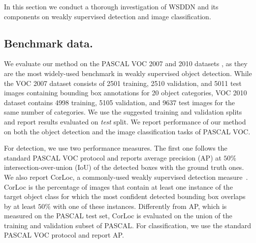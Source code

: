 In this section we conduct a thorough investigation of WSDDN and its components on weakly supervised detection and image classification.

\subsection{Benchmark data.}
We evaluate our method on the PASCAL VOC 2007 and 2010 datasets \cite{Everingham10}, as they are the most widely-used benchmark in weakly supervised object detection. While the VOC 2007 dataset consists of 2501 training, 2510 validation, and 5011 test images containing bounding box annotations for 20 object categories, VOC 2010 dataset contains 4998 training, 5105 validation, and 9637 test images for the same number of categories. We use the suggested training and validation splits and report results evaluated on \emph{test} split. We report performance of our method on both the object detection and the image classification tasks of PASCAL VOC. 

For detection, we use two performance measures. The first one follows the standard PASCAL VOC protocol and reports average precision (AP) at  $50\%$ intersection-over-union (IoU) of the detected boxes with the ground truth ones. We also report CorLoc, a commonly-used weakly supervised detection measure~\cite{Deselaers12}. CorLoc is the percentage of images that contain at least one instance of the target object class for which the most confident detected bounding box overlaps by at least $50\%$ with one of these instances. Differently from AP, which is measured on the PASCAL test set, CorLoc is evaluated on the union of the training and validation subset of PASCAL. For classification, we use the standard PASCAL VOC protocol and report AP.


